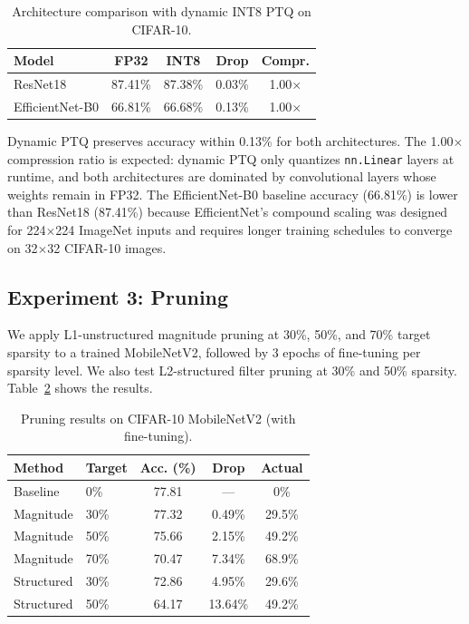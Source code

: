 \documentclass[10pt,twocolumn]{article}
\begin{document}
\begin{table}[t]
\caption{Architecture comparison with dynamic INT8 PTQ on CIFAR-10.}
\label{tab:arch}
\centering
\begin{tabular}{lcccc}
\toprule
\textbf{Model} & \textbf{FP32} & \textbf{INT8} & \textbf{Drop} & \textbf{Compr.} \\
\midrule
ResNet18 & 87.41\% & 87.38\% & 0.03\% & 1.00$\times$ \\
EfficientNet-B0 & 66.81\% & 66.68\% & 0.13\% & 1.00$\times$ \\
\bottomrule
\end{tabular}
\end{table}

Dynamic PTQ preserves accuracy within 0.13\% for both architectures.
The 1.00$\times$ compression ratio is expected: dynamic PTQ only quantizes \texttt{nn.Linear} layers at runtime, and both architectures are dominated by convolutional layers whose weights remain in FP32.
The EfficientNet-B0 baseline accuracy (66.81\%) is lower than ResNet18 (87.41\%) because EfficientNet's compound scaling was designed for 224$\times$224 ImageNet inputs and requires longer training schedules to converge on 32$\times$32 CIFAR-10 images.

\subsection{Experiment 3: Pruning}

We apply L1-unstructured magnitude pruning at 30\%, 50\%, and 70\% target sparsity to a trained MobileNetV2, followed by 3 epochs of fine-tuning per sparsity level.
We also test L2-structured filter pruning at 30\% and 50\% sparsity.
Table~\ref{tab:pruning} shows the results.

\begin{table}[t]
\caption{Pruning results on CIFAR-10 MobileNetV2 (with fine-tuning).}
\label{tab:pruning}
\centering
\begin{tabular}{llccc}
\toprule
\textbf{Method} & \textbf{Target} & \textbf{Acc. (\%)} & \textbf{Drop} & \textbf{Actual} \\
\midrule
Baseline & 0\% & 77.81 & --- & 0\% \\
\midrule
Magnitude & 30\% & 77.32 & 0.49\% & 29.5\% \\
Magnitude & 50\% & 75.66 & 2.15\% & 49.2\% \\
Magnitude & 70\% & 70.47 & 7.34\% & 68.9\% \\
\midrule
Structured & 30\% & 72.86 & 4.95\% & 29.6\% \\
Structured & 50\% & 64.17 & 13.64\% & 49.2\% \\
\bottomrule
\end{tabular}
\end{table}
\end{document}
